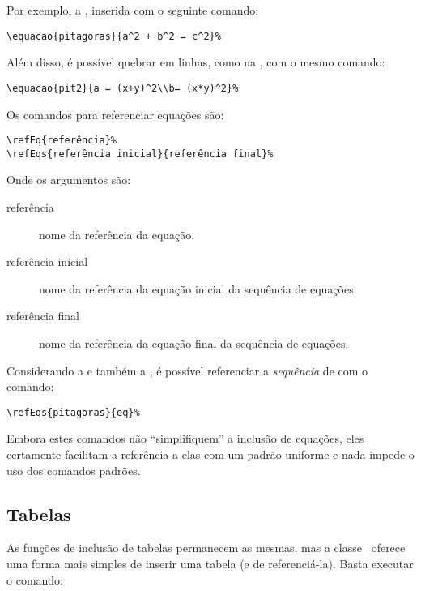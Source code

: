 Por exemplo, a , inserida com o seguinte comando:
\begin{verbatim}
\equacao{pitagoras}{a^2 + b^2 = c^2}%
\end{verbatim}

%

Além disso, é possível quebrar em linhas, como na , com o mesmo comando:
\begin{verbatim}
\equacao{pit2}{a = (x+y)^2\\b= (x*y)^2}%
\end{verbatim}

%

Os comandos para referenciar equações são:

\begin{verbatim}
\refEq{referência}%
\refEqs{referência inicial}{referência final}%
\end{verbatim}

Onde os argumentos são:
\begin{description}
\item[referência] nome da referência da equação.
\item[referência inicial] nome da referência da equação inicial da sequência de equações.
\item[referência final] nome da referência da equação final da sequência de equações.
\end{description}

Considerando a  e também a , é possível referenciar 
a \emph{sequência} de  com o comando:
\begin{verbatim}
\refEqs{pitagoras}{eq}%
\end{verbatim}

Embora estes comandos não ``simplifiquem'' a inclusão de equações, eles 
certamente facilitam a referência a elas com um padrão uniforme e nada impede o 
uso dos comandos padrões.

%


\subsection{Tabelas}
As funções de inclusão de tabelas permanecem as mesmas, mas a classe \unbcic\ 
oferece uma forma mais simples de inserir uma tabela (e de referenciá-la). Basta 
executar o comando:

